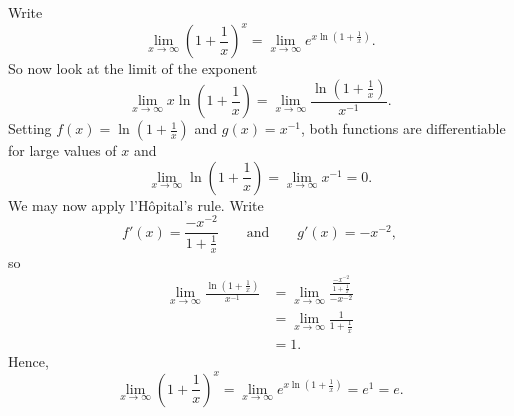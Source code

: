 \begin{solution}
Write
\[
\lim_{x\to \infty}\left(1 + \frac{1}{x}\right)^x = \lim_{x\to \infty}e^{x\ln\left(1 + \frac{1}{x}\right)}.
\]
So now look at the limit of the exponent
\[
\lim_{x\to\infty} x\ln\left(1 + \frac{1}{x}\right) = \lim_{x\to\infty} \frac{\ln\left(1 + \frac{1}{x}\right)}{x^{-1}}.
\]
Setting $f(x) = \ln\left(1 + \frac{1}{x}\right)$ and $g(x) = x^{-1}$,
both functions are differentiable for large values of $x$ and
\[
\lim_{x\to \infty}\ln\left(1 + \frac{1}{x}\right)=\lim_{x\to \infty}x^{-1} = 0.
\]
We may now apply l'H\^opital's rule. Write
\[
f'(x) = \frac{-x^{-2}}{1 + \frac{1}{x}}\qquad\text{and}\qquad g'(x) = -x^{-2},
\]
so
\begin{align*}
\lim_{x\to\infty} \frac{\ln\left(1 + \frac{1}{x}\right)}{x^{-1}} &= \lim_{x\to\infty} \frac{\frac{-x^{-2}}{1 + \frac{1}{x}}}{-x^{-2}} \\
&=\lim_{x\to\infty} \frac{1}{1 + \frac{1}{x}}\\
&=1.
\end{align*}
Hence, 
\[
\lim_{x\to \infty}\left(1 + \frac{1}{x}\right)^x = \lim_{x\to \infty}e^{x\ln\left(1 + \frac{1}{x}\right)} =e^{1} = e.
\]
\end{solution}











